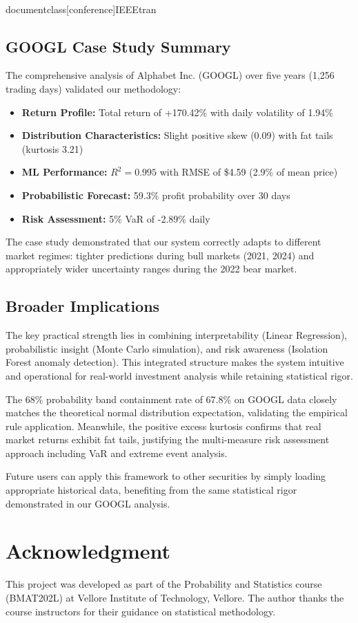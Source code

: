 \\documentclass[conference]{IEEEtran}
\begin{document}
\subsection{GOOGL Case Study Summary}
The comprehensive analysis of Alphabet Inc. (GOOGL) over five years (1,256 trading days) validated our methodology:
\begin{itemize}
    \item \textbf{Return Profile:} Total return of +170.42\% with daily volatility of 1.94\%
    \item \textbf{Distribution Characteristics:} Slight positive skew (0.09) with fat tails (kurtosis 3.21)
    \item \textbf{ML Performance:} $R^2 = 0.995$ with RMSE of \$4.59 (2.9\% of mean price)
    \item \textbf{Probabilistic Forecast:} 59.3\% profit probability over 30 days
    \item \textbf{Risk Assessment:} 5\% VaR of -2.89\% daily
\end{itemize}

The case study demonstrated that our system correctly adapts to different market regimes: tighter predictions during bull markets (2021, 2024) and appropriately wider uncertainty ranges during the 2022 bear market.

\subsection{Broader Implications}
The key practical strength lies in combining interpretability (Linear Regression), probabilistic insight (Monte Carlo simulation), and risk awareness (Isolation Forest anomaly detection). This integrated structure makes the system intuitive and operational for real-world investment analysis while retaining statistical rigor.

The 68\% probability band containment rate of 67.8\% on GOOGL data closely matches the theoretical normal distribution expectation, validating the empirical rule application. Meanwhile, the positive excess kurtosis confirms that real market returns exhibit fat tails, justifying the multi-measure risk assessment approach including VaR and extreme event analysis.

Future users can apply this framework to other securities by simply loading appropriate historical data, benefiting from the same statistical rigor demonstrated in our GOOGL analysis.

\section*{Acknowledgment}
This project was developed as part of the Probability and Statistics course (BMAT202L) at Vellore Institute of Technology, Vellore. The author thanks the course instructors for their guidance on statistical methodology.
\end{document}
